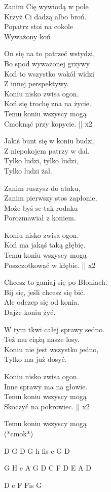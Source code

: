\begin{text}
Zanim Cię wywiodą w pole\\
Krzyż Ci dadzą albo broń.\\
Popatrz stoi na cokole\\
Wyważony koń

On się na to patrzeć wstydzi,\\
Bo spod wyważonej grzywy \\
Koń to wszystko wokół widzi\\
Z innej perspektywy.\\

Koniu nisko zwisa ogon.\\
Koń się trochę zna na życie.\\
Temu koniu wszyscy mogą\\
Cmoknąć przy kopycie. || x2

Jakiś bunt się w koniu budzi,\\
Z niepokojem patrzy w dal.\\
Tylko ludzi, tylko ludzi,\\
Tylko ludzi żal.

Zanim ruszysz do ataku,\\
Zanim pierwszy stos zapłonie,\\
Może byś se tak rodaku\\
Porozmawiał z koniem.

Koniu nisko zwisa ogon.\\
Koń ma jakąś taką głębię.\\
Temu koniu wszyscy mogą\\
Poszczotkować w kłębie. || x2

Chcesz to ganiaj się po Błoniach.\\
Bij się, jeśli chcesz się bić.\\
Ale odczep się od konia.\\
Dajże koniu żyć.

W tym tkwi całej sprawy sedno.\\
Też mu ciążą nasze losy.\\
Koniu nie jest wszystko jedno,\\
Tylko ma już dosyć.

Koniu nisko zwisa ogon.\\
Inne sprawy ma na głowie.\\
Temu koniu wszyscy mogą\\
Skoczyć na pokrowiec. || x2

Temu koniu wszyscy mogą\\
(*cmok*)
\end{text}
\begin{chord}
D G
D G
h fis e G D

G H
e A G
D C F D
E A D

D e F Fis G
\end{chord}
